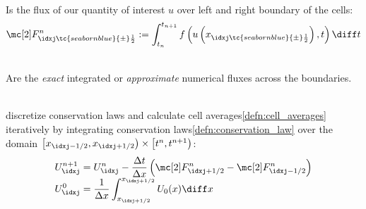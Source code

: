 \begin{defnbox}\nospacing
    \begin{defn}\label{defn:integrated_fluxes}\leavevmode\\
        Is the flux of our quantity of interest $u$ over left and right boundary of the cells:
        \begin{align}
          \Flux_{\idxj\tc{seabornblue}{\pm}\frac{1}{2}}^{n}:=\int_{t_{n}}^{t_{n+1}}f \left(u\left(x_{\idxj\tc{seabornblue}{\pm}\frac{1}{2}}\right),t\right)\diff t\label{eq:integrated_fluxes}
        \end{align}
        \begin{figure}[H]
            \centering{
              \def\svgwidth{200pt}
              \resizebox{0.9\linewidth}{!}{}
            }
        \end{figure}
    \end{defn}
\end{defnbox}
\begin{defnbox}\nospacing
    \begin{defn}\label{defn:numerical_fluxes}\leavevmode\\
        Are the \textit{exact} integrated or \textit{approximate} numerical fluxes across the boundaries.
    \end{defn}
\end{defnbox}
\begin{defnbox}\nospacing
    \begin{defn}\label{defn:finite_volume_scheme}\leavevmode\\
        discretize conservation laws and calculate cell averages\cref{defn:cell_averages} iteratively by integrating conservation laws\cref{defn:conservation_law}
        over the domain $\left[x_{\idxj-1/2},x_{\idxj+1/2}\right)\times \left[t^{n},t^{n+1}\right)$:
        \begin{align}
          U_{\idxj}^{n+1}&=U_{\idxj}^{n}-\frac{\Delta t}{\Delta x}\left(\Flux^{n}_{\idxj+1/2}-\Flux^{n}_{\idxj-1/2}\right)\nonumber\\[-1\jot]
          U_{\idxj}^{0}&=\frac{1}{\Delta x}\int^{x_{\idxj+1/2}}_{x_{\idxj+1/2}}U_{0}(x)\diff x\label{eq:finite_volume_scheme}
        \end{align}
    \end{defn}
\end{defnbox}
